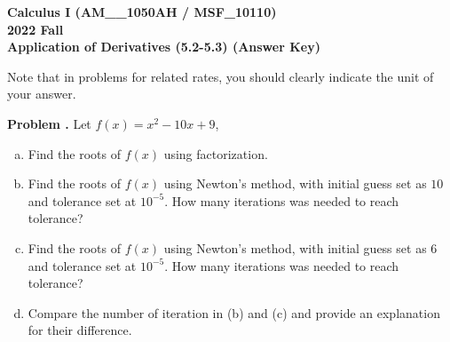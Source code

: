 \documentclass[11pt,letterpaper]{article}
\newcounter{problem}
\newcommand{\problem}{
	\stepcounter{problem}%
	\noindent \textbf{Problem \theproblem. }%
}
\begin{document}
\noindent\textbf{\large Calculus I (AM\_\_1050AH / MSF\_10110) \\ 2022 Fall \\ Application of Derivatives (5.2-5.3) (Answer Key)}

\bigskip

\noindent Note that in problems for related rates, you should clearly indicate the unit of your answer. 

\bigskip

\problem Let $f(x) = x^2 - 10x + 9$,
\begin{enumerate}[(a)]
    \item Find the roots of $f(x)$ using factorization.
    \item Find the roots of $f(x)$ using Newton's method, with initial guess set as $10$ and tolerance set at $10^{-5}$.  How many iterations was needed to reach tolerance?
    \item Find the roots of $f(x)$ using Newton's method, with initial guess set as $6$ and tolerance set at $10^{-5}$.  How many iterations was needed to reach tolerance?
    \item Compare the number of iteration in (b) and (c) and provide an explanation for their difference.
\end{enumerate}\vspace{6mm}
\end{document}
